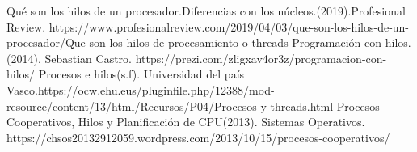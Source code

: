 \documentclass{report}   %
\begin{document}
\begin{thebibliography}{0}
   Qué son los hilos de un procesador.Diferencias con los núcleos.(2019).Profesional Review.
  https://www.profesionalreview.com/2019/04/03/que-son-los-hilos-de-un-procesador/Que-son-los-hilos-de-procesamiento-o-threads
   Programación con hilos.(2014). Sebastian Castro. https://prezi.com/zligxav4or3z/programacion-con-hilos/
   Procesos e hilos(s.f). Universidad del país Vasco.https://ocw.ehu.eus/pluginfile.php/12388/mod-resource/content/13/html/Recursos/P04/Procesos-y-threads.html
   Procesos Cooperativos, Hilos y Planificación de CPU(2013). Sistemas Operativos. https://chsos20132912059.wordpress.com/2013/10/15/procesos-cooperativos/
\end{thebibliography}
\end{document}
